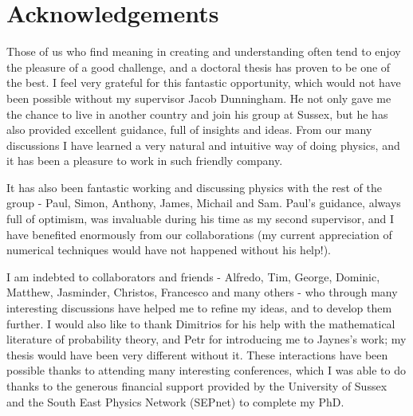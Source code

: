 \documentclass[a4paper,12pt,oneside]{report}
\newcommand{\linespacing}{1}
\renewcommand{\baselinestretch}{\linespacing}
\newcommand\blankpage{
    \null
    \thispagestyle{empty}
    \newpage}
\begin{document}
\clearpage


\chapter*{Acknowledgements}
\renewcommand{\baselinestretch}{\linespacing}
\small\normalsize

Those of us who find meaning in creating and understanding often tend to enjoy the pleasure of a good challenge, and a doctoral thesis has proven to be one of the best. I feel very grateful for this fantastic opportunity, which would not have been possible without my supervisor Jacob Dunningham. He not only gave me the chance to live in another country and join his group at Sussex, but he has also provided excellent guidance, full of insights and ideas. From our many discussions I have learned a very natural and intuitive way of doing physics, and it has been a pleasure to work in such friendly company. 

It has also been fantastic working and discussing physics with the rest of the group - Paul, Simon, Anthony, James, Michail and Sam. Paul's guidance, always full of optimism, was invaluable during his time as my second supervisor, and I have benefited enormously from our collaborations (my current appreciation of numerical techniques would have not happened without his help!).

I am indebted to collaborators and friends - Alfredo, Tim, George, Dominic, Matthew, Jasminder, Christos, Francesco and many others - who through many interesting discussions have helped me to refine my ideas, and to develop them further. I would also like to thank Dimitrios for his help with the mathematical literature of probability theory, and Petr for introducing me to Jaynes's work; my thesis would have been very different without it. These interactions have been possible thanks to attending many interesting conferences, which I was able to do thanks to the generous financial support provided by the University of Sussex and the South East Physics Network (SEPnet) to complete my PhD.
\end{document}
